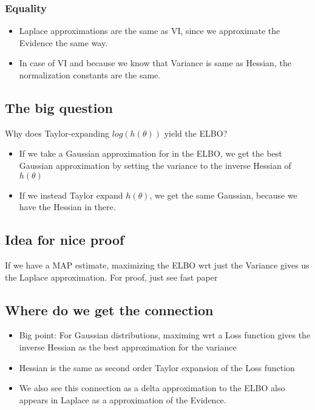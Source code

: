 \documentclass[a4paper]{scrartcl}
\begin{document}
      \subsubsection{Equality}
      \begin{itemize}
        \item Laplace approximations are the same as VI, since we approximate the
        Evidence the same way.
        \item In case of VI and because we know that Variance is same as
        Hessian, the normalization constants are the same.
      \end{itemize}

    \subsection{The big question}
      Why does Taylor-expanding $log(h(\theta))$ yield the ELBO?
      \begin{itemize}
        \item If we take a Gaussian approximation for in the ELBO, we get the
        best Gaussian approximation by setting the variance to the inverse Hessian of $h(\theta)$
        \item If we instead Taylor expand $h(\theta)$, we get the same Gaussian,
        because we have the Hessian in there.
      \end{itemize}

    \subsection{Idea for nice proof}
      If we have a MAP estimate, maximizing the ELBO wrt just the Variance gives
      us the Laplace approximation. For proof, just see fast paper


    \subsection{Where do we get the connection}
      \begin{itemize}
        \item Big point: For Gaussian distributions, maximing wrt a Loss
        function gives the inverse Hessian as the best approximation for the variance
        \item Hessian is the same as second order Taylor expansion of the Loss function
        \item We also see this connection as a delta approximation to the ELBO also appears in Laplace as a approximation of the Evidence.
      \end{itemize}



    
\end{document}
